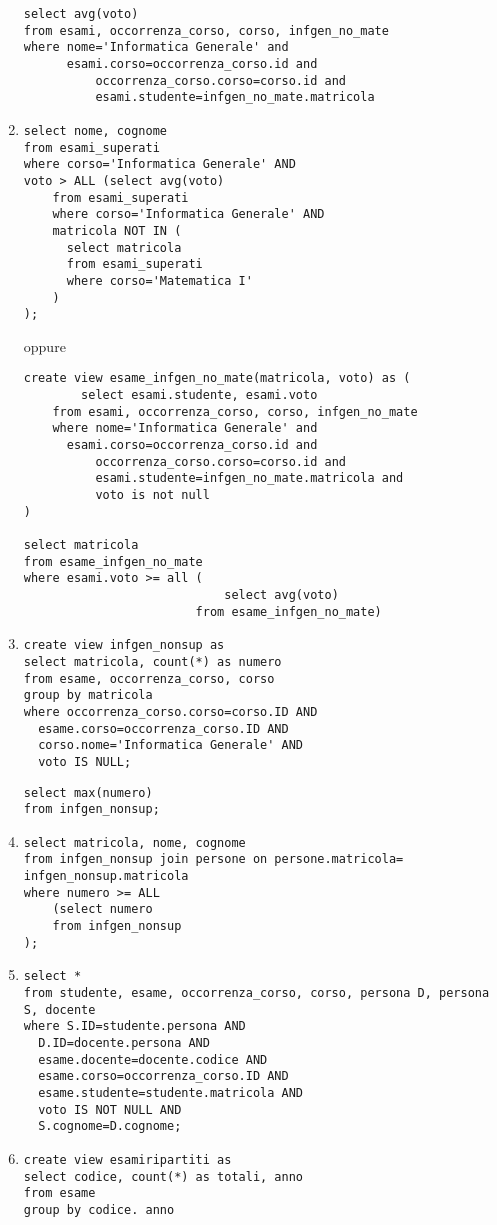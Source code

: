 \documentclass[11pt]{article}
\begin{document}
\begin{enumerate}
\begin{verbatim}
select avg(voto)
from esami, occorrenza_corso, corso, infgen_no_mate
where nome='Informatica Generale' and
      esami.corso=occorrenza_corso.id and
          occorrenza_corso.corso=corso.id and
          esami.studente=infgen_no_mate.matricola
\end{verbatim}
\item
\begin{verbatim}
select nome, cognome
from esami_superati
where corso='Informatica Generale' AND
voto > ALL (select avg(voto)
    from esami_superati
    where corso='Informatica Generale' AND
    matricola NOT IN (
      select matricola
      from esami_superati
      where corso='Matematica I'
    )
);
\end{verbatim}
oppure
\begin{verbatim}
create view esame_infgen_no_mate(matricola, voto) as (
        select esami.studente, esami.voto
    from esami, occorrenza_corso, corso, infgen_no_mate
    where nome='Informatica Generale' and
      esami.corso=occorrenza_corso.id and
          occorrenza_corso.corso=corso.id and
          esami.studente=infgen_no_mate.matricola and
          voto is not null
)

select matricola
from esame_infgen_no_mate
where esami.voto >= all (
                            select avg(voto)
                        from esame_infgen_no_mate)
\end{verbatim}
\item
\begin{verbatim}
create view infgen_nonsup as
select matricola, count(*) as numero
from esame, occorrenza_corso, corso
group by matricola
where occorrenza_corso.corso=corso.ID AND
  esame.corso=occorrenza_corso.ID AND
  corso.nome='Informatica Generale' AND
  voto IS NULL;
\end{verbatim}
\begin{verbatim}
select max(numero)
from infgen_nonsup;
\end{verbatim}
\item
\begin{verbatim}
select matricola, nome, cognome
from infgen_nonsup join persone on persone.matricola= infgen_nonsup.matricola
where numero >= ALL
    (select numero
    from infgen_nonsup
);
\end{verbatim}
\item
\begin{verbatim}
select *
from studente, esame, occorrenza_corso, corso, persona D, persona S, docente
where S.ID=studente.persona AND
  D.ID=docente.persona AND
  esame.docente=docente.codice AND
  esame.corso=occorrenza_corso.ID AND
  esame.studente=studente.matricola AND
  voto IS NOT NULL AND
  S.cognome=D.cognome;
\end{verbatim}
\item
\begin{verbatim}
create view esamiripartiti as
select codice, count(*) as totali, anno
from esame
group by codice. anno


\end{verbatim}
\end{enumerate}
\end{document}
